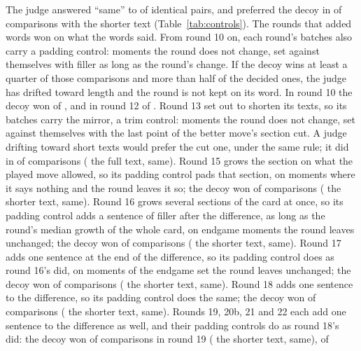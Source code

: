 \documentclass[11pt]{article}
\begin{document}
The judge answered ``same'' to \LengthIdentitySame{} of \LengthIdentityN{} identical pairs, and
preferred the decoy in \LengthPaddingDecoy{} of \LengthPaddingN{} comparisons with the shorter
text (Table~\ref{tab:controls}). The rounds that added words won on what the words said.
From round 10 on, each round's batches also carry a padding control: moments the round does not
change, set against themselves with filler as long as the round's change. If the decoy wins at
least a quarter of those comparisons and more than half of the decided ones, the judge has drifted
toward length and the round is not kept on its word. In round 10 the decoy won \PadTenDecoy{} of
\PadTenN, and in round 12 \PadTwelveDecoy{} of \PadTwelveN. Round 13 set out to shorten its texts, so
its batches carry the mirror, a trim control: moments the round does not change, set against themselves
with the last point of the better move's section cut. A judge drifting toward short texts would
prefer the cut one, under the same rule; it did in \TrimThirteenDecoy{} of \TrimThirteenN{}
comparisons (\TrimThirteenUnchanged{} the full text, \TrimThirteenSame{} same). Round 15 grows the
section on what the played move allowed, so its padding control pads that section, on moments where
it says nothing and the round leaves it so; the decoy won \PadFifteenDecoy{} of \PadFifteenN{}
comparisons (\PadFifteenUnchanged{} the shorter text, \PadFifteenSame{} same). Round 16 grows
several sections of the card at once, so its padding control adds a sentence of filler after the
difference, as long as the round's median growth of the whole card, on endgame moments the round
leaves unchanged; the decoy won \PadSixteenDecoy{} of \PadSixteenN{} comparisons
(\PadSixteenUnchanged{} the shorter text, \PadSixteenSame{} same). Round 17 adds one sentence at
the end of the difference, so its padding control does as round 16's did, on moments of the endgame
set the round leaves unchanged; the decoy won \PadSeventeenDecoy{} of \PadSeventeenN{} comparisons
(\PadSeventeenUnchanged{} the shorter text, \PadSeventeenSame{} same). Round 18 adds one sentence
to the difference, so its padding control does the same; the decoy won \PadEighteenDecoy{} of
\PadEighteenN{} comparisons (\PadEighteenUnchanged{} the shorter text, \PadEighteenSame{} same).
Rounds 19, 20b, 21 and 22 each add one sentence to the difference as well, and their padding
controls do as round 18's did: the decoy won \PadNineteenDecoy{} of \PadNineteenN{} comparisons in
round 19 (\PadNineteenUnchanged{} the shorter text, \PadNineteenSame{} same), \PadTwentyDecoy{} of
\end{document}
